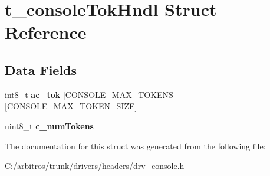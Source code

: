 \hypertarget{structt__console_tok_hndl}{\section{t\-\_\-console\-Tok\-Hndl Struct Reference}
\label{structt__console_tok_hndl}
}
\subsection*{Data Fields}
\begin{DoxyCompactItemize}
\item 
\hypertarget{structt__console_tok_hndl_a5da4ae36c0c86f4e292040dcfa814fad}{int8\-\_\-t {\bfseries ac\-\_\-tok} \mbox{[}C\-O\-N\-S\-O\-L\-E\-\_\-\-M\-A\-X\-\_\-\-T\-O\-K\-E\-N\-S\mbox{]}\mbox{[}C\-O\-N\-S\-O\-L\-E\-\_\-\-M\-A\-X\-\_\-\-T\-O\-K\-E\-N\-\_\-\-S\-I\-Z\-E\mbox{]}}\label{structt__console_tok_hndl_a5da4ae36c0c86f4e292040dcfa814fad}

\item 
\hypertarget{structt__console_tok_hndl_a143bcd8f046c8817cfe6577cf473883e}{uint8\-\_\-t {\bfseries c\-\_\-num\-Tokens}}\label{structt__console_tok_hndl_a143bcd8f046c8817cfe6577cf473883e}

\end{DoxyCompactItemize}


The documentation for this struct was generated from the following file\-:\begin{DoxyCompactItemize}
\item 
C\-:/arbitros/trunk/drivers/headers/drv\-\_\-console.\-h\end{DoxyCompactItemize}
